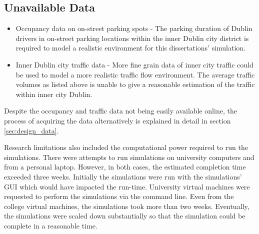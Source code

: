 \subsection*{Unavailable Data}
\begin{itemize}
    \item Occupancy data on on-street parking spots - The parking duration of Dublin drivers in on-street parking locations within the inner Dublin city district is required to model a realistic environment for this dissertations' simulation.
    \item Inner Dublin city traffic data - More fine grain data of inner city traffic could be used to model a more realistic traffic flow environment. The average traffic volumes as listed above is unable to give a reasonable estimation of the traffic within inner city Dublin.
\end{itemize}

Despite the occupancy and traffic data not being easily available online, the process of acquiring the data alternatively is explained in detail in section \ref{sec:design_data}.

Research limitations also included the computational power required to run the simulations. There were attempts to run simulations on university computers and from a personal laptop. However, in both cases, the estimated completion time exceeded three weeks. Initially the simulations were run with the simulations' GUI which would have impacted the run-time. University virtual machines were requested to perform the simulations via the command line. Even from the college virtual machines, the simulations took more than two weeks. Eventually, the simulations were scaled down substantially so that the simulation could be complete in a reasonable time.